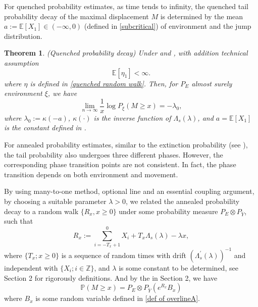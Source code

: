 \documentclass[]{article}
\numberwithin{equation}{section}
\theoremstyle{thmstyleone}%
\newtheorem{theorem}{Theorem}%
\theoremstyle{thmstyletwo}%
\theoremstyle{thmstylethree}%
\theoremstyle{thmstylefour}%
\theoremstyle{thmstylefive}%
\theoremstyle{thmstylesix}%
\newcommand{\E}{\mathbb{E}}
\renewcommand{\P}{\mathbb{P}}
\begin{document}
	For quenched probability estimates, as time tends to infinity, the quenched tail probability decay of the maximal displacement $M$ is determined by the mean $a:=\E[X_1]\in (-\infty,0)$ (defined in \cref{subcritical}) of environment and the jump distribution.
	\begin{theorem}\label{Quenched theorem}(Quenched probability decay)
		Under  and , with addition technical assumption
		\begin{equation}\label{addition assumption for quenchde probability}
			\E\left[ \eta_1 \right] <\infty.
		\end{equation}
	    where $\eta$ is defined in \cref{quenched random walk}.
		Then, for $P_E$ almost surely environment $\xi$, we have
		\begin{equation}
			\lim\limits_{n\rightarrow\infty}
			\frac{1}{x}\log P_\xi\left(M\geqslant x\right) = -\lambda_0,
		\end{equation}
		where $\lambda_0:= \kappa(-a)$, $\kappa(\cdot)$ is the inverse function of $\Lambda_s(\lambda)$, and $a = \E[X_1]$ is the constant defined in .
	\end{theorem}
	
	For annealed probability estimates, similar to the extinction probability (see ), the tail probability also undergoes three different phases. However, the corresponding phase transition points are not consistent. In fact, the phase transition depends on both environment and movement.
	
	By using many-to-one method, optional line and an essential coupling argument, by choosing a suitable parameter $\lambda>0$, we related the annealed probability decay to a random walk $\{R_x,x\geqslant 0\}$ under some probability measure $ P_E\otimes P_{\overline{Y}} $, such that
	\begin{equation}\label{18}
		R_x :=  \sum_{i=-T_x+1}^{0} X_i + T_x\Lambda_s(\lambda)-\lambda x,
	\end{equation}
	where $\{T_x;x\geqslant0\}$ is a sequence of random times with drift $\left(\Lambda_s^\prime(\lambda)\right)^{-1}$ and independent with $\{X_i;i\in \mathbb{Z}\}$, and $\lambda$ is some constant to be determined, see Section 2 for rigorously 
	definitions.
	And by the  in Section 2, we have 
	\begin{equation}
		\P(M\geqslant x) = P_E\otimes P_{\overline{Y}} \left(e^{R_x}B_x\right)
	\end{equation}
	where $B_x$ is some random variable defined in \cref{def of overlineA}.
	
\end{document}
